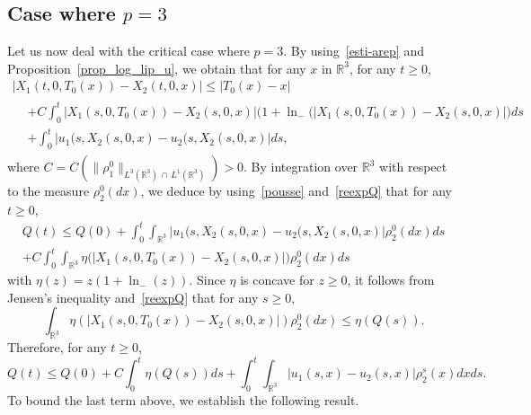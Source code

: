\documentclass[AHL,Unicode,longabstracts,published]{cedram}
\newcommand{\R}{\mathbb{R}}
\renewcommand{\leq}{\leqslant}
\renewcommand{\geq}{\geqslant}
\begin{document}
\subsection{Case where \texorpdfstring{$p= 3$}{p=3}} Let us now deal with the critical case where $p= 3$. By using~\eqref{esti-arep} and Proposition~\ref{prop_log_lip_u}, we obtain that for any $x$ in $\R^3$, for any $t\geq 0$,
\begin{multline*}
\big|X_1(t,0,T_0 (x))-X_2(t,0,x)\big| \leq |T_0 (x)-x|
\\
\begin{aligned}
&+ C \int_0^t \big|X_1(s,0,T_0 (x)) - X_2(s,0,x) \big|\big(1+\ln_{-}(|X_1(s,0,T_0 (x)) - X_2(s,0,x) |\big) ds\\
&+
\int_0^t \big|u_1(s,X_2(s,0,x) - u_2(s,X_2(s,0,x) \big| ds,
\end{aligned}
\end{multline*}
where $C=C(\|\rho_1^0\|_{L^3 (\R^3)\, \cap\, L^1 (\R^3)})>0$. By integration over $\R^3$ with respect to the measure $\rho_2^0(dx)$, we deduce by using~\eqref{pousse} and~\eqref{reexpQ} that for any $t\geq 0$,
\begin{multline*}
Q(t) \leq Q(0) + \int_0^t \int_{ \R^3}\big|u_1(s,X_2(s,0,x) - u_2(s,X_2(s,0,x) \big|\rho_2^0(dx) ds
\\ + C \int_0^t\int_{\R^3} \eta\big(|X_1(s,0,T_0 (x)) - X_2(s,0,x) |\big) \rho_2^0(dx) ds
\end{multline*}
with $\eta(z)=z(1+\ln_{-}(z)) $. Since $\eta $ is concave for $z\geq 0$, it follows from Jensen's inequality and~\eqref{reexpQ} that for any $s\geq 0$,
\[
\int_{\R^3} \eta\left(|X_1(s,0,T_0 (x)) - X_2(s,0,x) |\right)\rho_2^0(dx) \leq \eta \left(Q(s) \right).
\]
Therefore, for any $t\geq 0$,
\begin{equation}\label{ineq-Q_p=3}
Q(t)
\leq Q(0)+ C \int_0^t \eta\left(Q(s)\right) ds+ \int_0^t \int_{\R^3}|u_1(s,x) - u_2(s,x) |\rho_2^s(x)dx ds.
\end{equation}
To bound the last term above, we establish the following result.
\end{document}
